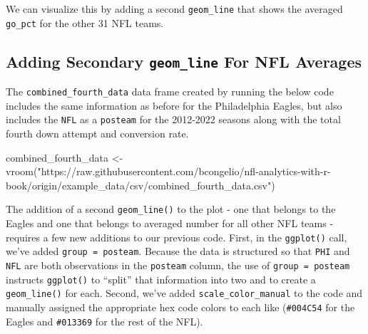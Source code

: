 \documentclass[
  letterpaper,
]{krantz}
\newenvironment{Shaded}{\begin{snugshade}}{\end{snugshade}}
\newcommand{\FunctionTok}[1]{\textcolor[rgb]{0.28,0.35,0.67}{#1}}
\newcommand{\NormalTok}[1]{\textcolor[rgb]{0.00,0.23,0.31}{#1}}
\newcommand{\OtherTok}[1]{\textcolor[rgb]{0.00,0.23,0.31}{#1}}
\newcommand{\StringTok}[1]{\textcolor[rgb]{0.13,0.47,0.30}{#1}}
\begin{document}
We can visualize this by adding a second \texttt{geom\_line} that shows
the averaged \texttt{go\_pct} for the other 31 NFL teams.

\hypertarget{adding-secondary-geom_line-for-nfl-averages}{%
\subsection{\texorpdfstring{Adding Secondary \texttt{geom\_line} For NFL
Averages}{Adding Secondary geom\_line For NFL Averages}}\label{adding-secondary-geom_line-for-nfl-averages}}

The \texttt{combined\_fourth\_data} data frame created by running the
below code includes the same information as before for the Philadelphia
Eagles, but also includes the \texttt{NFL} as a \texttt{posteam} for the
2012-2022 seasons along with the total fourth down attempt and
conversion rate.

\begin{Shaded}
\begin{Highlighting}[]
\NormalTok{combined\_fourth\_data }\OtherTok{\textless{}{-}}
  \FunctionTok{vroom}\NormalTok{(}\StringTok{"https://raw.githubusercontent.com/bcongelio/nfl{-}analytics{-}with{-}r{-}book/origin/example\_data/csv/combined\_fourth\_data.csv"}\NormalTok{)}
\end{Highlighting}
\end{Shaded}

The addition of a second \texttt{geom\_line()} to the plot - one that
belongs to the Eagles and one that belongs to averaged number for all
other NFL teams - requires a few new additions to our previous code.
First, in the \texttt{ggplot()} call, we've added
\texttt{group\ =\ posteam}. Because the data is structured so that
\texttt{PHI} and \texttt{NFL} are both observations in the
\texttt{posteam} column, the use of \texttt{group\ =\ posteam} instructs
\texttt{ggplot()} to ``split'' that information into two and to create a
\texttt{geom\_line()} for each. Second, we've added
\texttt{scale\_color\_manual} to the code and manually assigned the
appropriate hex code colors to each like (\texttt{\#004C54} for the
Eagles and \texttt{\#013369} for the rest of the NFL).
\end{document}
